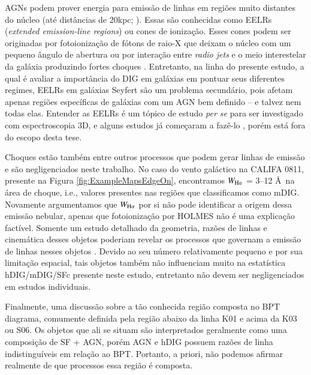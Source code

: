 AGNs podem prover energia para emissão de linhas em regiões muito distantes do núcleo (até distâncias de 20kpc; \citealt{Veilleux.etal.2003}). Essas são conhecidas como EELRs ({\em extended emission-line regions}) ou cones de ionização. Esses cones podem ser originadas por fotoionização de fótons de raio-X que deixam o núcleo com um pequeno ângulo de abertura ou por interação entre {\em radio jets} e o meio interestelar da galáxia produzindo fortes choques \citep{Wilson.1996}. Entretanto, na linha do presente estudo, a qual é avaliar a importância do DIG em galáxias em pontuar seus diferentes regimes, EELRs em galáxias Seyfert são um problema secundário, pois afetam apenas regiões específicas de galáxias com um AGN bem definido -- e talvez nem todas elas. Entender as EELRs é um tópico de estudo {\em per se} para ser investigado com espectroscopia 3D, e alguns estudos já começaram a fazê-lo \citep[e.g.,][]{Dopita.etal.2014}, porém está fora do escopo desta tese.

Choques estão também entre outros processos que podem gerar linhas de emissão e são negligenciados neste trabalho. No caso do vento galáctico na CALIFA 0811, presente na Figura \ref{fig:ExampleMapsEdgeOn}, encontramos $W_{\Ha}$ = 3--12 \AA\ na área de choque, i.e., valores presentes nas regiões que classificamos como mDIG. Novamente argumentamos que $W_{\Ha}$ por si não pode identificar a origem dessa emissão nebular, apenas que fotoionização por HOLMES não é uma explicação factível. Somente um estudo detalhado da geometria, razões de linhas e cinemática desses objetos poderiam revelar os processos que governam a emissão de linhas nesses objetos \citep{Kreckel.etal.2014, Beirao.etal.2015, LopezCoba.etal.2017}. Devido ao seu número relativamente pequeno e por sua limitação espacial, tais objetos também não influenciam muito na estatística hDIG/mDIG/SFc presente neste estudo, entretanto não devem ser negligenciados em estudos individuais.

Finalmente, uma discussão sobre a tão conhecida região composta no BPT diagrama, comumente definida pela região abaixo da linha K01 e acima da K03 ou S06. Os objetos que ali se situam são interpretados geralmente como uma composição de SF + AGN, porém AGN e hDIG possuem razões de linha indistinguíveis em relação ao BPT. Portanto, a priori, não podemos afirmar realmente de que processos essa região é composta.


